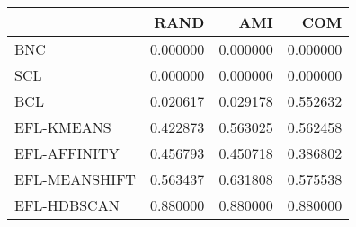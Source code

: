 \begin{tabular}{lrrr}
\toprule
 & RAND & AMI & COM \\
\midrule
BNC & 0.000000 & 0.000000 & 0.000000 \\
SCL & 0.000000 & 0.000000 & 0.000000 \\
BCL & 0.020617 & 0.029178 & 0.552632 \\
EFL-KMEANS & 0.422873 & 0.563025 & 0.562458 \\
EFL-AFFINITY & 0.456793 & 0.450718 & 0.386802 \\
EFL-MEANSHIFT & 0.563437 & 0.631808 & 0.575538 \\
EFL-HDBSCAN & 0.880000 & 0.880000 & 0.880000 \\
\bottomrule
\end{tabular}
